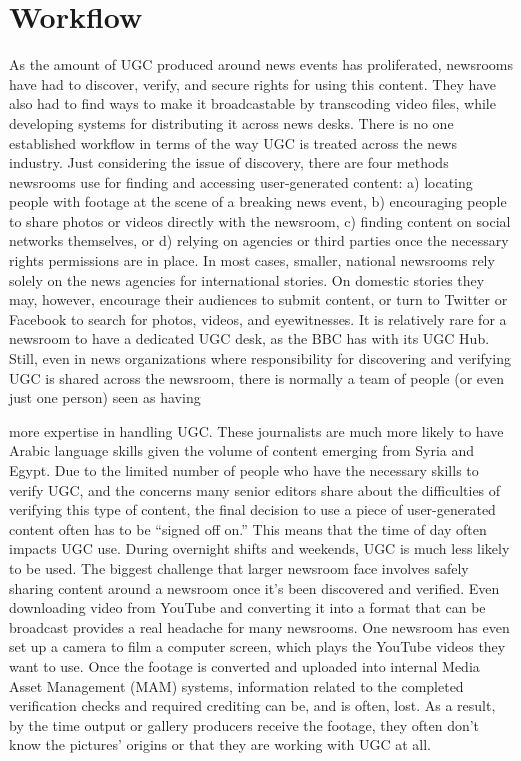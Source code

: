\documentclass[symmetric, notoc, nobib]{towcenter-book}
\begin{document}
\chapter{Workflow}
As the amount of UGC produced around news events has proliferated,
newsrooms have had to discover, verify, and secure rights for using this
content. They have also had to find ways to make it broadcastable by
transcoding video files, while developing systems for distributing it across
news desks.
There is no one established workflow in terms of the way UGC is treated
across the news industry. Just considering the issue of discovery, there are
four methods newsrooms use for finding and accessing user-generated content:
a) locating people with footage at the scene of a breaking news event,
b) encouraging people to share photos or videos directly with the newsroom,
c) finding content on social networks themselves, or d) relying on
agencies or third parties once the necessary rights permissions are in place.
In most cases, smaller, national newsrooms rely solely on the news agencies
for international stories. On domestic stories they may, however, encourage
their audiences to submit content, or turn to Twitter or Facebook to search
for photos, videos, and eyewitnesses.
It is relatively rare for a newsroom to have a dedicated UGC desk, as the
BBC has with its UGC Hub. Still, even in news organizations where responsibility
for discovering and verifying UGC is shared across the newsroom,
there is normally a team of people (or even just one person) seen as having

more expertise in handling UGC. These journalists are much more likely
to have Arabic language skills given the volume of content emerging from
Syria and Egypt.
Due to the limited number of people who have the necessary skills to verify
UGC, and the concerns many senior editors share about the difficulties of
verifying this type of content, the final decision to use a piece of user-generated
content often has to be ``signed off on.'' This means that the time of
day often impacts UGC use. During overnight shifts and weekends, UGC is
much less likely to be used.
The biggest challenge that larger newsroom face involves safely sharing
content around a newsroom once it's been discovered and verified. Even
downloading video from YouTube and converting it into a format that can
be broadcast provides a real headache for many newsrooms. One newsroom
has even set up a camera to film a computer screen, which plays
the YouTube videos they want to use. Once the footage is converted and
uploaded into internal Media Asset Management (MAM) systems, information
related to the completed verification checks and required crediting
can be, and is often, lost. As a result, by the time output or gallery producers
receive the footage, they often don't know the pictures' origins or that they
are working with UGC at all.
\end{document}
